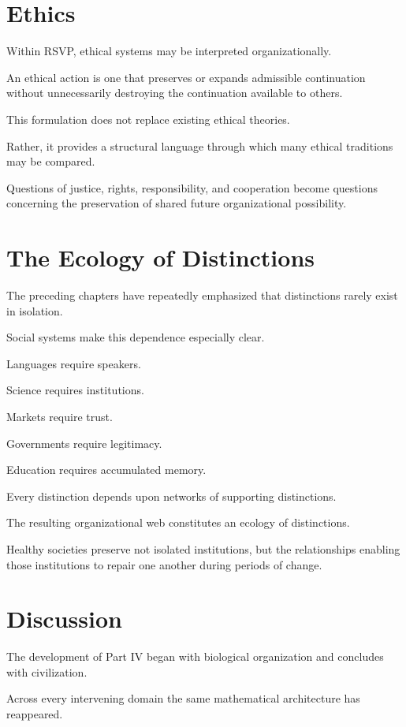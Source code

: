 \documentclass[11pt,oneside]{book}
\numberwithin{equation}{chapter}
\theoremstyle{definition}
\theoremstyle{plain}
\begin{document}
\section{Ethics}

Within RSVP, ethical systems may be interpreted organizationally.

An ethical action is one that preserves or expands admissible continuation
without unnecessarily destroying the continuation available to others.

This formulation does not replace existing ethical theories.

Rather, it provides a structural language through which many ethical
traditions may be compared.

Questions of justice, rights, responsibility, and cooperation become
questions concerning the preservation of shared future organizational
possibility.

\section{The Ecology of Distinctions}

The preceding chapters have repeatedly emphasized that distinctions rarely
exist in isolation.

Social systems make this dependence especially clear.

Languages require speakers.

Science requires institutions.

Markets require trust.

Governments require legitimacy.

Education requires accumulated memory.

Every distinction depends upon networks of supporting distinctions.

The resulting organizational web constitutes an ecology of distinctions.

Healthy societies preserve not isolated institutions, but the relationships
enabling those institutions to repair one another during periods of
change.

\section{Discussion}

The development of Part IV began with biological organization and
concludes with civilization.

Across every intervening domain the same mathematical architecture has
reappeared.
\end{document}
